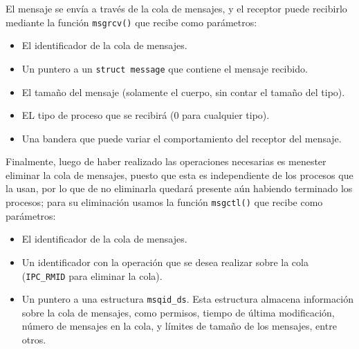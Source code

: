 El mensaje se envía a través de la cola de mensajes, y el receptor puede recibirlo mediante la función \texttt{msgrcv()} que recibe como parámetros:\begin{itemize}
    \item El identificador de la cola de mensajes.
    \item Un puntero a un \texttt{struct message} que contiene el mensaje recibido.
    \item El tamaño del mensaje (solamente el cuerpo, sin contar el tamaño del tipo).
    \item EL tipo de proceso que se recibirá ($0$ para cualquier tipo).
    \item Una bandera que puede variar el comportamiento del receptor del mensaje.
\end{itemize}

Finalmente, luego de haber realizado las operaciones necesarias es menester eliminar la cola de mensajes, puesto que esta es independiente de los procesos que la usan, por lo que de no eliminarla quedará presente aún habiendo terminado los procesos; para su eliminación usamos la función \texttt{msgctl()} que recibe como parámetros:\begin{itemize}
    \item El identificador de la cola de mensajes.
    \item Un identificador con la operación que se desea realizar sobre la cola (\texttt{IPC\_RMID} para eliminar la cola).
    \item Un puntero a una estructura \texttt{msqid\_ds}. Esta estructura almacena información sobre la cola de mensajes, como permisos, tiempo de última modificación, número de mensajes en la cola, y límites de tamaño de los mensajes, entre otros.
\end{itemize}